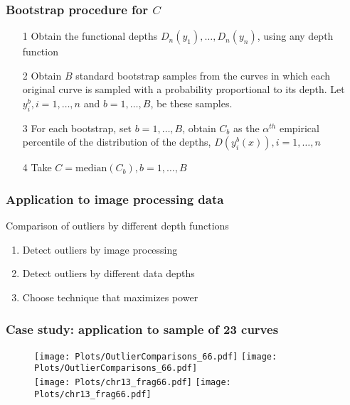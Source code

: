 \documentclass[10pt,dvipsnames,table]{beamer}
\begin{document}
\begin{frame}
\frametitle{Bootstrap procedure for $C$}
\begin{enumerate}
\item[1] Obtain the functional depths $D_n(y_1), \dots, D_n(y_n)$, using any depth function
\pause
\item[2] Obtain $B$ standard bootstrap samples from the curves in which each original curve is sampled with a probability proportional to its depth. Let $y_i^b, i = 1, \dots, n$ and $b = 1, \dots, B$, be these samples.
\pause
\item[3] For each bootstrap, set $b = 1, \dots, B$, obtain $C_b$ as the $\alpha^{th}$ empirical percentile of the distribution of the depths, $D(y_i^b(x)), i = 1, \dots, n$
\pause
\item[4] Take $C = \text{median}(C_b), b = 1, \dots, B$ 
\end{enumerate}
\end{frame}

\begin{frame}
\frametitle{Application to image processing data}
\Large
\begin{block}{Comparison of outliers by different depth functions}
\begin{enumerate}
\item Detect outliers by image processing
\item Detect outliers by different data depths
\item Choose technique that maximizes power
\end{enumerate}
\end{block}
\end{frame}

\begin{frame}
\frametitle{Case study: application to sample of 23 curves}
\vspace{-0.5cm}
\begin{figure}[t]
\texttt{[image: Plots/OutlierComparisons\_66.pdf]}
\hspace{0.5cm}
\pause
\texttt{[image: Plots/OutlierComparisons\_66.pdf]} \\
\texttt{[image: Plots/chr13\_frag66.pdf]}
\pause
\hspace{0.5cm}
\pause
\texttt{[image: Plots/chr13\_frag66.pdf]}
\end{figure}
\end{frame}
\end{document}
